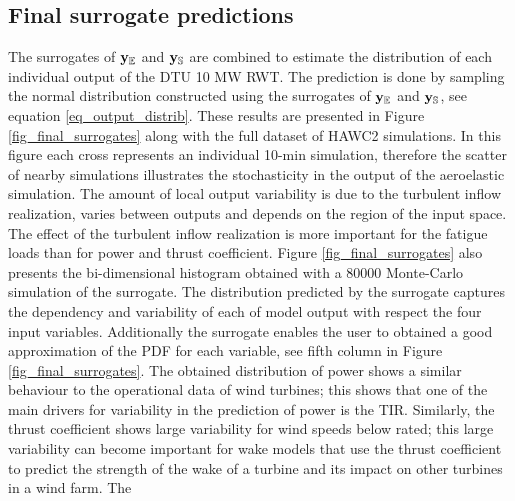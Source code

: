\documentclass[preprint,12pt]{elsarticle}
\begin{document}
\subsection{Final surrogate predictions}

The surrogates of $\mathbf{y}_{\mathbb{E}}$ and $\mathbf{y}_{\mathbb{S}}$ are combined to estimate the distribution of each individual output of the DTU 10 MW RWT. The prediction is done by sampling the normal distribution constructed using the surrogates of $\mathbf{y}_{\mathbb{E}}$ and $\mathbf{y}_{\mathbb{S}}$, see equation \ref{eq_output_distrib}. These results are presented in Figure \ref{fig_final_surrogates} along with the full dataset of HAWC2 simulations. In this figure each cross represents an individual 10-min simulation, therefore the scatter of nearby simulations illustrates the stochasticity in the output of the aeroelastic simulation. The amount of local output variability is due to the turbulent inflow realization, varies between outputs and depends on the region of the input space. The effect of the turbulent inflow realization is more important for the fatigue loads than for power and thrust coefficient. Figure \ref{fig_final_surrogates} also presents the bi-dimensional histogram obtained with a 80000 Monte-Carlo simulation of the surrogate. The distribution predicted by the surrogate captures the dependency and variability of each of model output with respect the four input variables. Additionally the surrogate enables the user to obtained a good approximation of the PDF for each variable, see fifth column in Figure \ref{fig_final_surrogates}. The obtained distribution of power shows a similar behaviour to the operational data of wind turbines; this shows that one of the main drivers for variability in the prediction of power is the TIR. Similarly, the thrust coefficient shows large variability for wind speeds below rated; this large variability can become important for wake models that use the thrust coefficient to predict the strength of the wake of a turbine and its impact on other turbines in a wind farm. The 
\end{document}
